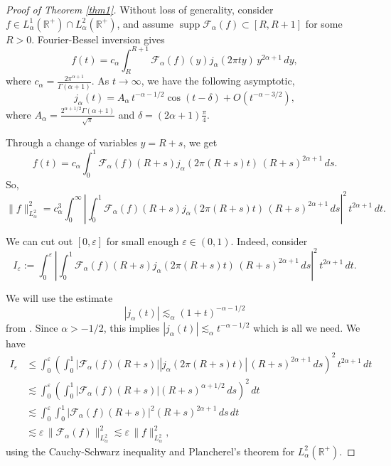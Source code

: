 \documentclass[11pt,a4paper,reqno,dvipsnames]{amsart}
\newcommand{\supp}{\operatorname{supp}}
\newcommand{\F}{\mathcal{F}}
\newcommand{\ep}{\varepsilon}
\newcommand{\R}{\mathbb R}
\renewcommand{\le}{\leqslant}
\numberwithin{equation}{section}
\theoremstyle{plain}
\theoremstyle{definition}
\theoremstyle{remark}
\begin{document}
\begin{proof}[Proof of Theorem \ref{thm1}]
    Without loss of generality, consider $f\in L^1_\alpha(\R^+) \cap L^2_\alpha(\R^+)$, and assume $\supp \F_\alpha(f) \subset [R,R+1]$ for some $R > 0$. Fourier-Bessel inversion gives
$$f(t) = c_\alpha \int_R^{R+1} \mathcal{F}_\alpha(f)(y) j_\alpha(2\pi ty)\, y^{2\alpha + 1}\, dy,$$
where $c_\alpha = \frac{2\pi^{\alpha + 1}}{\Gamma(\alpha + 1)}.$ As $t\to\infty$, we have the following asymptotic,
$$j_{\alpha}(t) = A_\alpha\,
t^{-\alpha - 1/2} \cos\!\left( t -\delta \right)
+ O(t^{-\alpha - 3/2}),$$
where $A_\alpha =\frac{2^{\alpha + 1/2} \Gamma(\alpha + 1)}{\sqrt{\pi}}$ and $\delta = (2\alpha + 1)\frac{\pi}{4}$.

Through a change of variables $y = R+s$, we get
$$f(t) = c_\alpha\int_0^1 \mathcal{F}_\alpha(f)(R+s) j_\alpha(2\pi(R+s)t)\, (R+s)^{2\alpha + 1}\, ds.$$
So,
$$\|f\|_{L^2_\alpha}^2 = c_\alpha^3 \int_0^\infty \left|\int_0^1 \mathcal{F}_\alpha(f)(R+s) j_\alpha(2\pi(R+s)t)\, (R+s)^{2\alpha + 1}\, ds\right|^2 \, t^{2\alpha + 1}\, dt.$$

We can cut out $[0, \ep]$ for small enough $\ep \in (0,1)$. Indeed, consider
$$I_\ep := \int_0^\ep \left|\int_0^1 \mathcal{F}_\alpha(f)(R+s) j_\alpha(2\pi(R+s)t)\, (R+s)^{2\alpha + 1}\, ds\right|^2 \, t^{2\alpha + 1}\, dt.$$

We will use the estimate
\begin{equation}
    \label{bessel-function-estimate}
    |j_\alpha(t)| \lesssim_\alpha (1+t)^{-\alpha-1/2}
\end{equation}
from \cite{gj}. Since $\alpha > -1/2$, this implies $|j_\alpha(t)| \lesssim_\alpha t^{-\alpha-1/2}$ which is all we need. We have
\begin{align*}
    I_{\ep} &\le \int_0^\ep \left(\int_0^1 |\mathcal{F}_\alpha(f)(R+s)| |j_\alpha(2\pi(R+s)t)|\, (R+s)^{2\alpha + 1}\, ds\right)^2 \, t^{2\alpha + 1}\, dt\\
    &\lesssim \int_0^\ep \left(\int_0^1 |\mathcal{F}_\alpha(f)(R+s)| (R+s)^{\alpha + 1/2}\, ds\right)^2 \, dt\\ 
    &\lesssim \int_0^\ep \int_0^1 |\mathcal{F}_\alpha(f)(R+s)|^2 (R+s)^{2\alpha + 1}\, ds \, dt\\
    &\lesssim \ep\,  \|\F_\alpha(f)\|^2_{L^2_\alpha} \lesssim \ep\, \|f\|^2_{L^2_\alpha},
\end{align*}
using the Cauchy-Schwarz inequality and Plancherel's theorem for $L^2_\alpha(\R^+)$.


\end{proof}
\end{document}
